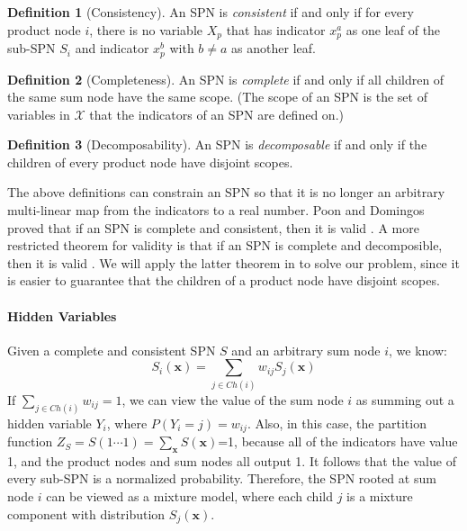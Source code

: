 \documentclass[10pt, titlepage]{article}
\theoremstyle{definition}
\newtheorem{definition}{Definition}[section]
\newcommand\mb{\mathbf}
\begin{document}
\begin{definition}[Consistency]
An SPN is \textit{consistent} if and only if for every product node $i$, there is no variable $X_p$ that has indicator $x_p^a$ as one leaf of the sub-SPN $S_i$ and indicator $x_p^b$ with $b\neq a$ as another leaf.
\end{definition}

\begin{definition}[Completeness]
An SPN is \textit{complete} if and only if all children of the same sum node have the same scope. (The scope of an SPN is the set of variables in $\mathcal{X}$ that the indicators of an SPN are defined on.)
\end{definition}

\begin{definition}[Decomposability]
An SPN is \textit{decomposable} if and only if the children of every product node have disjoint scopes.
\end{definition}

The above definitions can constrain an SPN so that it is no longer an arbitrary multi-linear map from the indicators to a real number. Poon and Domingos proved that if an SPN is complete and consistent, then it is valid \cite{poon2011sum}. A more restricted theorem for validity is that if an SPN is complete and decomposible, then it is valid \cite{peharz2015theoretical}. We will apply the latter theorem in to solve our problem, since it is easier to guarantee that the children of a product node have disjoint scopes.

\paragraph{Hidden Variables}
Given a complete and consistent SPN $S$ and an arbitrary sum node $i$, we know:
\begin{equation}
S_i(\mb{x})=\sum_{j\in Ch(i)}w_{ij}S_j(\mb{x})
\end{equation}
If $\sum_{j\in Ch(i)}w_{ij}=1$, we can view the value of the sum node $i$ as summing out a hidden variable $Y_i$, where $P(Y_i=j)=w_{ij}$. Also, in this case, the partition function $Z_S=S(1\cdots1)=\sum_{\mb{x}}S(\mb{x})$=1, because all of the indicators have value 1, and the product nodes and sum nodes all output 1. It follows that the value of every sub-SPN is a normalized probability. Therefore, the SPN rooted at sum node $i$ can be viewed as a mixture model, where each child $j$ is a mixture component with distribution $S_j(\mb{x})$.
\end{document}
